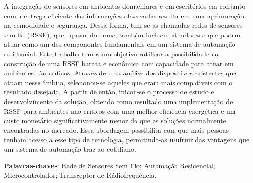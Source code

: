 \begin{resumo}

A integração de sensores em ambientes domiciliares e em escritórios em conjunto com a entrega eficiente das
informações observadas resulta em uma aprimoração na comodidade e segurança. Dessa forma, tem-se as chamadas
redes de sensores sem fio (RSSF), que, apesar do nome, também incluem atuadores e que podem atuar como um dos
componontes fundamentais em um sistema de automação residencial. Este trabalho tem como objetivo ratificar a
possibilidade da construção de uma RSSF barata e econômica com capacidade para atuar em ambientes não
crı́ticos. Através de uma análise dos dispositivos existentes que atuam nesse âmbito, selecionou-se aqueles que
eram mais compatı́veis com o resultado desejado. A partir de então, inicou-se o processo de estudo e
desenvolvimento da solução, obtendo como resultado uma implementação de RSSF para ambientes não críticos com uma
melhor eficiência energética e um custo monetário significativamente menor do que as soluções normalmente
encontradas no mercado. Essa abordagem possibilita com que mais pessoas tenham acesso a esse tipo de
tecnologia, permitindo-as usufruir das vantagens que um sistema de automação traz ao cotidiano.

\vspace{\onelineskip}
\noindent
\textbf{Palavras-chaves}: Rede de Sensores Sem Fio; Automação Residencial; Microcontrolador; Transceptor de
Rádiofrequência.
\end{resumo}
